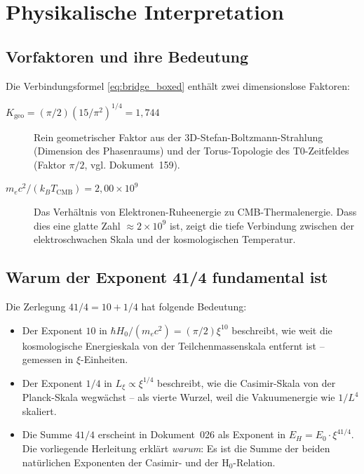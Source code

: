 \section{Physikalische Interpretation}
\label{sec:interpretation}

\subsection{Vorfaktoren und ihre Bedeutung}

Die Verbindungsformel \eqref{eq:bridge_boxed} enthält zwei dimensionslose Faktoren:

\begin{description}
    \item[$K_\text{geo} = (\pi/2)(15/\pi^2)^{1/4} = 1{,}744$]
        Rein geometrischer Faktor aus der 3D-Stefan-Boltzmann-Strahlung
        (Dimension des Phasenraums) und der Torus-Topologie des T0-Zeitfeldes
        (Faktor $\pi/2$, vgl. Dokument~159).

    \item[$m_e c^2 / (k_B T_\text{CMB}) = 2{,}00 \times 10^9$]
        Das Verhältnis von Elektronen-Ruheenergie zu CMB-Thermalenergie.
        Dass dies eine glatte Zahl $\approx 2 \times 10^9$ ist, zeigt
        die tiefe Verbindung zwischen der elektroschwachen Skala und der
        kosmologischen Temperatur.
\end{description}

\subsection{Warum der Exponent 41/4 fundamental ist}

Die Zerlegung $41/4 = 10 + 1/4$ hat folgende Bedeutung:

\begin{itemize}
    \item Der Exponent $10$ in $\hbar H_0/(m_e c^2) = (\pi/2)\xi^{10}$
    beschreibt, wie weit die kosmologische Energieskala von der
    Teilchenmassenskala entfernt ist -- gemessen in $\xi$-Einheiten.

    \item Der Exponent $1/4$ in $L_\xi \propto \xi^{1/4}$ beschreibt,
    wie die Casimir-Skala von der Planck-Skala wegwächst -- als
    vierte Wurzel, weil die Vakuumenergie wie $1/L^4$ skaliert.

    \item Die Summe $41/4$ erscheint in Dokument~026 als Exponent in
    $E_H = E_0 \cdot \xi^{41/4}$. Die vorliegende Herleitung erklärt
    \emph{warum}: Es ist die Summe der beiden natürlichen Exponenten
    der Casimir- und der H$_0$-Relation.
\end{itemize}


